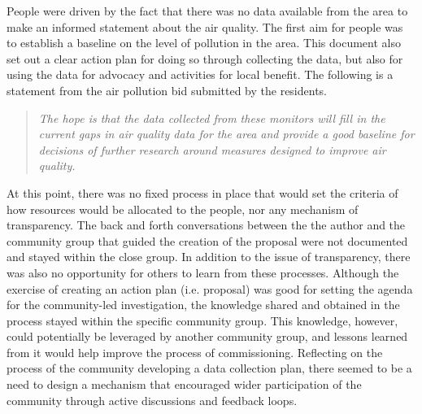 People were driven by the fact that there was no data available from the area to make an informed statement about the air quality. The first aim for people was to establish a baseline on the level of pollution in the area. This document also set out a clear action plan for doing so through collecting the data, but also for using the data for advocacy and activities for local benefit. The following is a statement from the air pollution bid submitted by the residents.

\begin{quote}
\textit{The hope is that the data collected from these monitors will fill in the current gaps in air quality data for the area and provide a good baseline for decisions of further research around measures designed to improve air quality.} \citep{space_for_heaton_air_2017}
\end{quote}

At this point, there was no fixed process in place that would set the criteria of how resources would be allocated to the people, nor any mechanism of transparency. The back and forth conversations between the the author and the community group that guided the creation of the proposal were not documented and stayed within the close group. In addition to the issue of transparency, there was also no opportunity for others to learn from these processes. Although the exercise of creating an action plan (i.e. proposal) was good for setting the agenda for the community-led investigation, the knowledge shared and obtained in the process stayed within the specific community group. This knowledge, however, could potentially be leveraged by another community group, and lessons learned from it would help improve the process of commissioning. Reflecting on the process of the community developing a data collection plan, there seemed to be a need to design a mechanism that encouraged wider participation of the community through active discussions and feedback loops.


